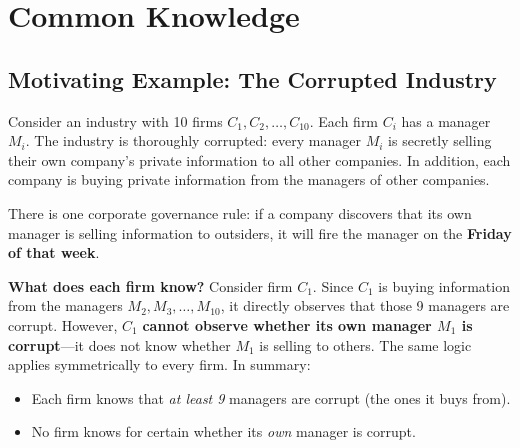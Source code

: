 \chapter{Common Knowledge}

\section{Motivating Example: The Corrupted Industry}

Consider an industry with 10 firms $C_1, C_2, \ldots, C_{10}$. Each firm $C_i$ has a manager $M_i$. The industry is thoroughly corrupted: every manager $M_i$ is secretly selling their own company's private information to all other companies. In addition, each company is buying private information from the managers of other companies.

\begin{center}
\end{center}

There is one corporate governance rule: if a company discovers that its own manager is selling information to outsiders, it will fire the manager on the \textbf{Friday of that week}.

\medskip
\noindent\textbf{What does each firm know?} Consider firm $C_1$. Since $C_1$ is buying information from the managers $M_2, M_3, \ldots, M_{10}$, it directly observes that those 9 managers are corrupt. However, $C_1$ \textbf{cannot observe whether its own manager $M_1$ is corrupt}---it does not know whether $M_1$ is selling to others. The same logic applies symmetrically to every firm. In summary:
\begin{itemize}
  \item Each firm knows that \textit{at least 9} managers are corrupt (the ones it buys from).
  \item No firm knows for certain whether its \textit{own} manager is corrupt.
\end{itemize}

